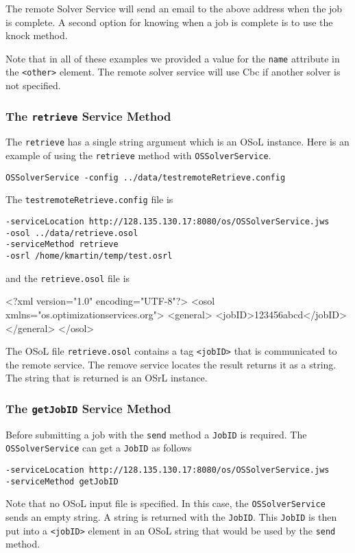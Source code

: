 \documentclass[11pt]{article}
\renewcommand{\_}{{\char"5F}}
\renewcommand{\{}{{\char"7B}}
\renewcommand{\}}{{\char"7D}}
\renewcommand{\^}{{\char"0D}}
\renewcommand{\'}{{\char"0D}}
\begin{document}
The remote Solver Service will send an email to the above address when the job is complete. A second option for knowing when a job is complete is to use the knock method. 

Note that in all of these examples we provided a value for the {\tt name} attribute in the {\tt <other>} element. The remote solver service will use Cbc if another solver is not specified. 



\subsubsection{The  {\tt retrieve} Service Method}\label{section:retrieve}

The {\tt retrieve} has a single string argument which is an OSoL instance. Here is an example of using the {\tt retrieve} method with {\tt OSSolverService}.
\begin{verbatim}
OSSolverService -config ../data/testremoteRetrieve.config
\end{verbatim}
The {\tt testremoteRetrieve.config} file is
\begin{verbatim}
-serviceLocation http://128.135.130.17:8080/os/OSSolverService.jws
-osol ../data/retrieve.osol
-serviceMethod retrieve
-osrl /home/kmartin/temp/test.osrl
\end{verbatim}
and the {\tt retrieve.osol} file is
\begin{verbatimtab}[4]
<?xml version="1.0" encoding="UTF-8"?>
<osol xmlns="os.optimizationservices.org">
 	<general>         
 		<jobID>123456abcd</jobID>  
	</general>
</osol>
\end{verbatimtab}
The OSoL file {\tt retrieve.osol} contains a tag {\tt <jobID>} that is communicated to the remote service. The remove service locates the result returns it as a string. The string that is returned is an OSrL instance. 

\subsubsection{The  {\tt getJobID} Service Method}\label{section:getjobid}

Before  submitting a job with the {\tt send} method a {\tt JobID} is required. The {\tt OSSolverService} can get a {\tt JobID} as follows
\begin{verbatim}
-serviceLocation http://128.135.130.17:8080/os/OSSolverService.jws
-serviceMethod getJobID
\end{verbatim}
Note that no OSoL input file is specified. In this case, the {\tt OSSolverService} sends an empty string. A string is returned with the {\tt JobID}. This {\tt JobID} is then put into a {\tt <jobID>} element in an OSoL string that would be used by the {\tt send} method.
\end{document}
